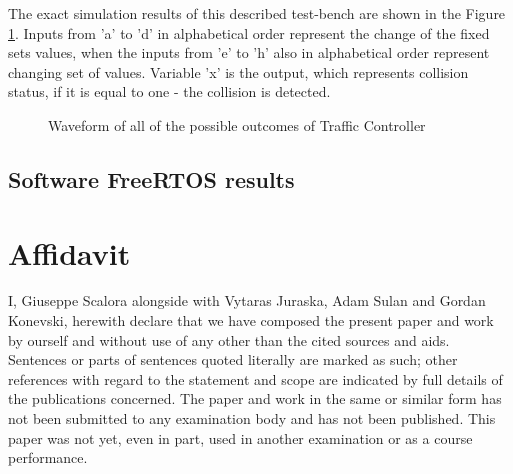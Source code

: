 \documentclass[conference]{IEEEtran}
\begin{document}
The exact simulation results of this described test-bench are shown in the Figure \ref{testbench}. Inputs from 'a' to 'd' in alphabetical order represent the change of the fixed sets values, when the inputs from 'e' to 'h' also in alphabetical order represent changing set of values. Variable 'x' is the output, which represents collision status, if it is equal to one - the collision is detected.
\begin{figure}[ht]
    \caption{Waveform of all of the possible outcomes of Traffic Controller}
    \label{testbench}
\end{figure}

\subsection{Software FreeRTOS results}


\begin{thebibliography}{00}
\end{thebibliography}

\section{Affidavit}
I, Giuseppe Scalora alongside with Vytaras Juraska, Adam Sulan and Gordan Konevski, herewith declare that we have composed the present paper and work by ourself and without use of any other than the cited sources and aids. Sentences or parts of sentences quoted literally are marked as such; other references with regard to the statement and scope are indicated by full details of the publications concerned. The paper and work in the same or similar form has not been submitted to any examination body and has not been published. This paper was not yet, even in part, used in another examination or as a course performance.
\end{document}
